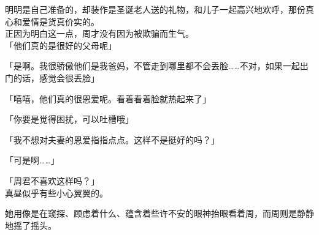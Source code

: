 明明是自己准备的，却装作是圣诞老人送的礼物，和儿子一起高兴地欢呼，那份真心和爱情是货真价实的。\\

正因为明白这一点，周才没有因为被欺骗而生气。\\

「他们真的是很好的父母呢」

「是啊。我很骄傲他们是我爸妈，不管走到哪里都不会丢脸……不对，如果一起出门的话，感觉会很丢脸」

「嘻嘻，他们真的很恩爱呢。看着看着脸就热起来了」

「你要是觉得困扰，可以吐槽哦」

「我不想对夫妻的恩爱指指点点。这样不是挺好的吗？」

「可是啊……」

「周君不喜欢这样吗？」\\

真昼似乎有些小心翼翼的。

她用像是在窥探、顾虑着什么、蕴含着些许不安的眼神抬眼看着周，而周则是静静地摇了摇头。\\

